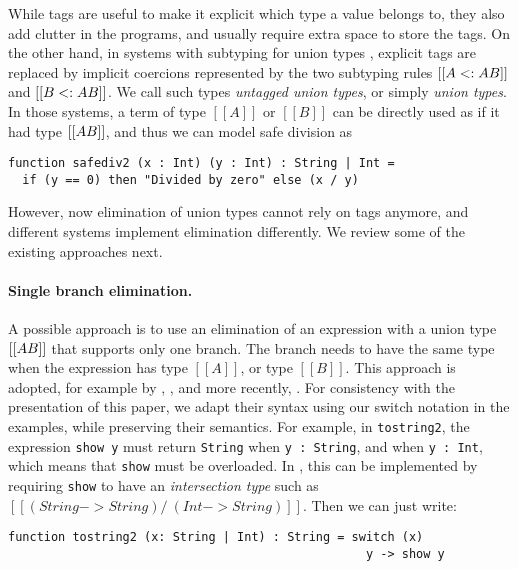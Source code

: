 While tags are useful to make it explicit which type a value belongs to, they
also add clutter in the programs, and usually require extra space to store the
tags. On the other hand, in systems with subtyping for union types
\cite{dunfield2014elaborating,pierce1991programming,muehlboeck2018empowering},
explicit tags are replaced by implicit coercions represented by the two
subtyping rules $[[A <: A \/ B]]$ and $[[B <: A \/ B]]$. We call such types
\textit{untagged union types}, or simply \textit{union types}. In those systems,
a term of type $[[A]]$ or $[[B]]$ can be directly used as if it had type $[[A \/
B]]$, and thus we can model safe division as

\begin{lstlisting}
function safediv2 (x : Int) (y : Int) : String | Int =
  if (y == 0) then "Divided by zero" else (x / y)
\end{lstlisting}

\noindent However, now elimination of union types cannot rely on tags anymore, and
different systems implement elimination differently. We review some of the
existing approaches next.

\paragraph{Single branch elimination.}

A possible approach is to use an elimination of an expression with a union type
$[[A \/ B]]$ that supports only one branch. The branch needs to have the same
type when the expression has type $[[A]]$, or type $[[B]]$. This approach is
adopted, for example by \citet{pierce1991programming},
\citet{barbanera1995intersection}, and more recently,
\citet{dunfield2014elaborating}. For consistency with the presentation of this paper,
we adapt their syntax
using our switch notation in the examples, while preserving their semantics. For
example, in \lstinline{tostring2}, the expression \lstinline{show y} must return
\lstinline{String} when \lstinline{y : String}, and when \lstinline{y : Int},
which means that \lstinline{show} must be overloaded. In
\citet{pierce1991programming,dunfield2014elaborating,barbanera1995intersection},
this can be implemented by requiring \lstinline{show} to have an
\textit{intersection type} such as $[[(String -> String) /\ (Int -> String)]]$.
Then we can just write:

\begin{lstlisting}
function tostring2 (x: String | Int) : String = switch (x)
                                                  y -> show y
\end{lstlisting}

